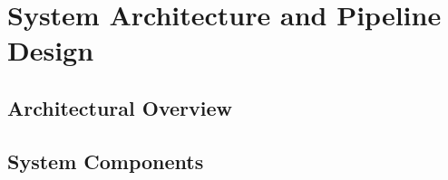 ﻿\chapter{System Architecture and Pipeline Design}
\label{ch:arch}

\section{Architectural Overview}
\label{sec:arch_overview}


\section{System Components}
\label{sec:components}

